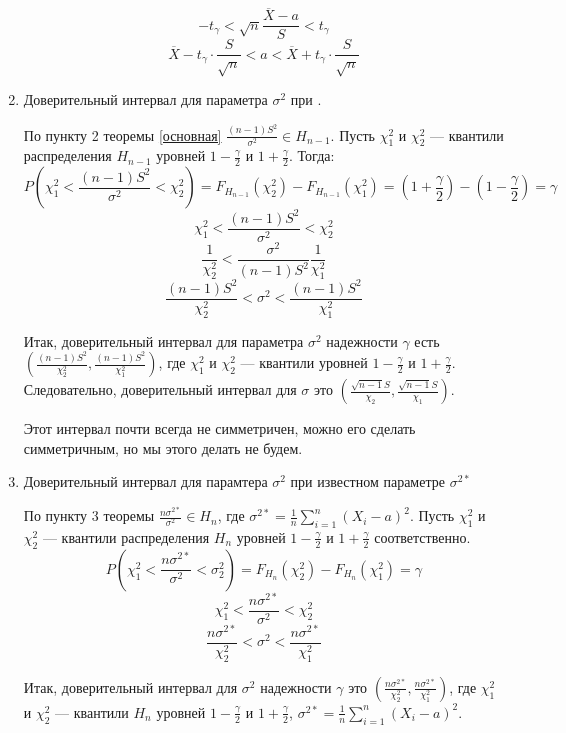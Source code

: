 \begin{enumerate}
          \[
              - t_\gamma < \sqrt{n} \frac{ \overline{X} - a}{S} < t_\gamma
          \]
          \[
              \overline{X} - t_\gamma \cdot \frac{S}{\sqrt{n}} < a < \overline{X} + t_\gamma \cdot \frac{S}{\sqrt{n}}
          \]
    \item Доверительный интервал для параметра \(\sigma^2\) при \?.

          По пункту 2 теоремы \ref{основная} \(\frac{(n - 1)S^2}{\sigma^2} \in H_{n-1}\). Пусть \(\chi_1^2\) и \(\chi_2^2\) --- квантили распределения \(H_{n-1}\) уровней \(1 - \frac{\gamma}{2}\) и \(1 + \frac{\gamma}{2}\). Тогда:
          \[P\left(\chi_1^2 < \frac{(n - 1)S^2}{\sigma^2} < \chi_2^2\right) = F_{H_{n-1}}(\chi_2^2) - F_{H_{n-1}}(\chi_1^2) = \left(1 + \frac{\gamma}{2}\right) - \left(1 - \frac{\gamma}{2}\right) = \gamma\]
          \[\chi_1^2 < \frac{(n - 1) S^2}{\sigma^2} < \chi_2^2\]
          \[\frac{1}{\chi_2^2} < \frac{\sigma^2}{(n - 1) S^2} \frac{1}{\chi_1^2}\]
          \[\frac{(n - 1) S^2}{\chi_2^2} < \sigma^2 < \frac{(n - 1) S^2}{\chi_1^2}\]

          Итак, доверительный интервал для параметра \(\sigma^2\) надежности \(\gamma\) есть \(\left(\frac{(n - 1) S^2}{\chi_2^2}, \frac{(n - 1) S^2}{\chi_1^2}\right)\), где \(\chi_1^2\) и \(\chi_2^2\) --- квантили уровней \(1 - \frac{\gamma}{2}\) и \(1 + \frac{\gamma}{2}\). Следовательно, доверительный интервал для \(\sigma\) это \(\left(\frac{\sqrt{n - 1} S}{\chi_2}, \frac{\sqrt{n - 1} S}{\chi_1}\right)\).

          Этот интервал почти всегда не симметричен, можно его сделать симметричным, но мы этого делать не будем.
    \item Доверительный интервал для парамтера \(\sigma^2\) при известном параметре \(\sigma^{2*}\)

          По пункту 3 теоремы \(\frac{n \sigma^{2*}}{\sigma^2} \in H_n\), где \(\sigma^{2*} = \frac{1}{n} \sum_{i=1}^{n} (X_i - a)^2\).
          Пусть \(\chi_1^2\) и \(\chi_2^2\) --- квантили распределения \(H_n\) уровней \(1 - \frac{\gamma}{2}\) и \(1 + \frac{\gamma}{2}\) соответственно.
          \[P\left(\chi_1^2 < \frac{n \sigma^{2*}}{\sigma^2} < \sigma_2^2\right) = F_{H_n} (\chi_2^2) - F_{H_n}(\chi_1^2) = \gamma\]
          \[\chi_1^2 < \frac{n \sigma^{2*}}{\sigma^2} < \chi_2^2\]
          \[\frac{n \sigma^{2*}}{\chi_2^2} < \sigma^2 < \frac{n\sigma^{2*}}{\chi_1^2}\]

          Итак, доверительный интервал для \(\sigma^2\) надежности \(\gamma\) это \(\left(\frac{n \sigma^{2*}}{\chi_2^2}, \frac{n\sigma^{2*}}{\chi_1^2}\right)\), где \(\chi_1^2\) и \(\chi_2^2\) --- квантили \(H_n\) уровней \(1 - \frac{\gamma}{2}\) и \(1 + \frac{\gamma}{2}\), \(\sigma^{2*} = \frac{1}{n} \sum_{i=1}^{n} (X_i - a)^2\).
\end{enumerate}

